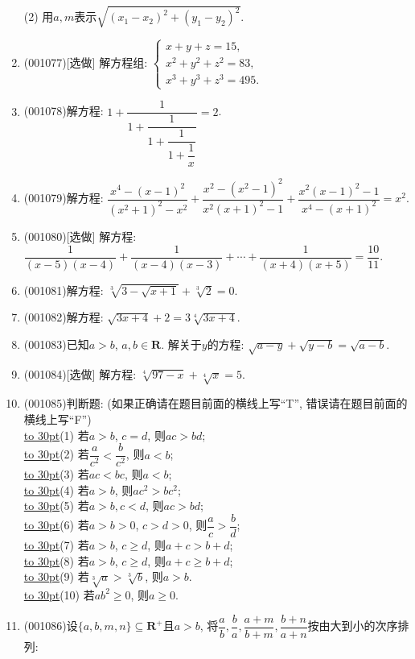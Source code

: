 \documentclass[10pt,a4paper]{article}
\newcommand{\blank}[1]{\underline{\hbox to #1pt{}}}
\begin{document}
\begin{enumerate}[1.]
(2) 用$a,m$表示$\sqrt{(x_1-x_2)^2+(y_1-y_2)^2}$.
\item {\tiny (001077)}[选做]
解方程组: $\left\{
\begin{array}{l}
x+y+z=15,\\
x^2+y^2+z^2=83,\\
x^3+y^3+z^3=495.
\end{array}\right.$
\item {\tiny (001078)}解方程: $1+\dfrac{1}{1+\dfrac{1}{1+\dfrac{1}{1+\dfrac{1}{x}}}}=2$.
\item {\tiny (001079)}解方程: $\dfrac{x^4-(x-1)^2}{(x^2+1)^2-x^2}+\dfrac{x^2-(x^2-1)^2}{x^2(x+1)^2-1}+\dfrac{x^2(x-1)^2-1}{x^4-(x+1)^2}=x^2$.
\item {\tiny (001080)}[选做]
解方程: $\dfrac{1}{(x-5)(x-4)}+\dfrac{1}{(x-4)(x-3)}+\cdots+\dfrac{1}{(x+4)(x+5)}=\dfrac{10}{11}$.
\item {\tiny (001081)}解方程: $\sqrt[3]{3-\sqrt{x+1}}+\sqrt[3]{2}=0$.
\item {\tiny (001082)}解方程: $\sqrt{3x+4}+2=3\sqrt[4]{3x+4}$.
\item {\tiny (001083)}已知$a>b$, $a,b\in \mathbf{R}$. 解关于$y$的方程: $\sqrt{a-y}+\sqrt{y-b}=\sqrt{a-b}$.
\item {\tiny (001084)}[选做]
解方程: $\sqrt[4]{97-x}+\sqrt[4]{x}=5$.
\item {\tiny (001085)}判断题: (如果正确请在题目前面的横线上写``T'', 错误请在题目前面的横线上写``F'')\\ 
\blank{30}(1) 若$a>b$, $c=d$, 则$ac>bd$;\\ 
\blank{30}(2) 若$\dfrac{a}{c^2}<\dfrac{b}{c^2}$, 则$a<b$;\\ 
\blank{30}(3) 若$ac<bc$, 则$a<b$;\\ 
\blank{30}(4) 若$a>b$, 则$ac^2>bc^2$;\\ 
\blank{30}(5) 若$a>b,c<d$, 则$ac>bd$;\\ 
\blank{30}(6) 若$a>b>0$, $c>d>0$, 则$\dfrac{a}{c}>\dfrac{b}{d}$;\\ 
\blank{30}(7) 若$a>b$, $c\geq d$, 则$a+c>b+d$;\\ 
\blank{30}(8) 若$a>b$, $c\geq d$, 则$a+c\geq b+d$;\\ 
\blank{30}(9) 若$\sqrt[3]{a}>\sqrt[3]{b}$, 则$a>b$.\\ 
\blank{30}(10) 若$ab^2\geq 0$, 则$a\geq 0$.
\item {\tiny (001086)}设$\{a,b,m,n\}\subseteq\mathbf{R}^+$且$a>b$, 将$\dfrac{a}{b},\dfrac{b}{a},\dfrac{a+m}{b+m},\dfrac{b+n}{a+n}$按由大到小的次序排列:\\

\end{enumerate}
\end{document}
